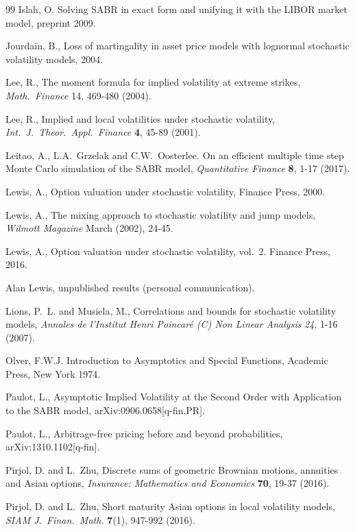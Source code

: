 \documentclass[11pt]{article}
\numberwithin{equation}{section}
\theoremstyle{plain}
\begin{document}
\begin{thebibliography}{99}
Islah, O.
Solving SABR in exact form and unifying it with the LIBOR market model,
preprint 2009.

Jourdain, B.,
Loss of martingality in asset price models with 
lognormal stochastic volatility models, 2004.

Lee, R.,
The moment formula for implied volatility at extreme strikes,
\textit{Math.~Finance} 14, 469-480 (2004).

Lee, R.,
Implied and local volatilities under stochastic volatility,
\textit{Int.~J.~Theor.~Appl.~Finance} \textbf{4}, 45-89 (2001).

Leitao, A., L.A.~Grzelak and C.W.~Oosterlee.
On an efficient multiple time step Monte Carlo simulation of the SABR model,
\textit{Quantitative Finance} \textbf{8}, 1-17 (2017).

Lewis, A.,
Option valuation under stochastic volatility,
Finance Press, 2000.

Lewis, A.,
The mixing approach to stochastic volatility and jump models,
\textit{Wilmott Magazine} March (2002), 24-45.

Lewis, A.,
Option valuation under stochastic volatility, vol.~2.
Finance Press, 2016.

Alan Lewis, unpublished results (personal communication).

Lions, P.~L. and Musiela, M.,
Correlations and bounds for stochastic volatility models,
\textit{Annales de l'Institut Henri Poincar\'e (C) Non Linear Analysis}
\textit{24}, 1-16 (2007).

Olver, F.W.J.
Introduction to Asymptotics and Special Functions,
Academic Press, New York 1974.

Paulot, L.,
Asymptotic Implied Volatility at the Second Order with Application
to the SABR model, 
arXiv:0906.0658[q-fin.PR].

Paulot, L.,
Arbitrage-free pricing before and beyond probabilities, 
arXiv:1310.1102[q-fin].

Pirjol, D. and L.~Zhu,
Discrete sums of geometric Brownian motions, annuities and Asian options,
\textit{Insurance: Mathematics and Economics}
\textbf{70}, 19-37 (2016).


Pirjol, D. and L.~Zhu,
Short maturity Asian options in local volatility models,
\textit{SIAM J.~Finan.~Math. }
\textbf{7}(1), 947-992 (2016).


\end{thebibliography}
\end{document}
